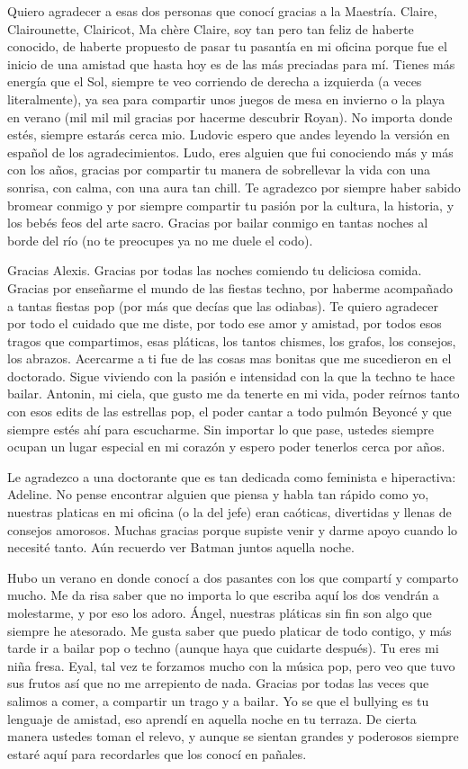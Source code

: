 Quiero agradecer a esas dos personas que conocí gracias a la Maestría. Claire, Clairounette, Clairicot, Ma chère Claire, soy tan pero tan feliz de haberte conocido, de haberte propuesto de pasar tu pasantía en mi oficina porque fue el inicio de una amistad que hasta hoy es de las más preciadas para mí. Tienes más energía que el Sol, siempre te veo corriendo de derecha a izquierda (a veces literalmente), ya sea para compartir unos juegos de mesa en invierno o la playa en verano (mil mil mil gracias por hacerme descubrir Royan). No importa donde estés, siempre estarás cerca mio. 
Ludovic espero que andes leyendo la versión en español de los agradecimientos. Ludo, eres alguien que fui conociendo más y más con los años, gracias por compartir tu manera de sobrellevar la vida con una sonrisa, con calma, con una aura tan chill. Te agradezco por siempre haber sabido bromear conmigo y por siempre compartir tu pasión por la cultura, la historia, y los bebés feos del arte sacro. Gracias por bailar conmigo en tantas noches al borde del río (no te preocupes ya no me duele el codo).

Gracias Alexis. Gracias por todas las noches comiendo tu deliciosa comida. Gracias por enseñarme el mundo de las fiestas techno, por haberme acompañado a tantas fiestas pop (por más que decías que las odiabas). Te quiero agradecer por todo el cuidado que me diste, por todo ese amor y amistad, por todos esos tragos que compartimos, esas pláticas, los tantos chismes, los grafos, los consejos, los abrazos. Acercarme a ti fue de las cosas mas bonitas que me sucedieron en el doctorado. Sigue viviendo con la pasión e intensidad con la que la techno te hace bailar.
Antonin, mi ciela, que gusto me da tenerte en mi vida, poder reírnos tanto con esos edits de las estrellas pop, el poder cantar a todo pulmón Beyoncé y que siempre estés ahí para escucharme.
Sin importar lo que pase, ustedes siempre ocupan un lugar especial en mi corazón y espero poder tenerlos cerca por años.

Le agradezco a una doctorante que es tan dedicada como feminista e hiperactiva: Adeline. No pense encontrar alguien que piensa y habla tan rápido como yo, nuestras platicas en mi oficina (o la del jefe) eran caóticas, divertidas y llenas de consejos amorosos. Muchas gracias porque supiste venir y darme apoyo cuando lo necesité tanto. Aún recuerdo ver Batman juntos aquella noche.

Hubo un verano en donde conocí a dos pasantes con los que compartí y comparto mucho. Me da risa saber que no importa lo que escriba aquí los dos vendrán a molestarme, y por eso los adoro. Ángel, nuestras pláticas sin fin son algo que siempre he atesorado. Me gusta saber que puedo platicar de todo contigo, y más tarde ir a bailar pop o techno (aunque haya que cuidarte después). Tu eres mi niña fresa. Eyal, tal vez te forzamos mucho con la música pop, pero veo que tuvo sus frutos así que no me arrepiento de nada. Gracias por todas las veces que salimos a comer, a compartir un trago y a bailar. Yo se que el bullying es tu lenguaje de amistad, eso aprendí en aquella noche en tu terraza.
De cierta manera ustedes toman el relevo, y aunque se sientan grandes y poderosos siempre estaré aquí para recordarles que los conocí en pañales.

